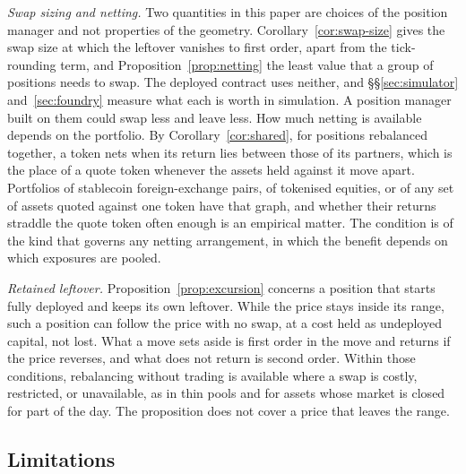 \documentclass[11pt,a4paper]{article}
\theoremstyle{siphon}
\begin{document}
\textit{Swap sizing and netting.} Two quantities in this paper are choices of the position manager and not properties of the geometry. Corollary~\ref{cor:swap-size} gives the swap size at which the leftover vanishes to first order, apart from the tick-rounding term, and Proposition~\ref{prop:netting} the least value that a group of positions needs to swap. The deployed contract uses neither, and \S\S\ref{sec:simulator} and~\ref{sec:foundry} measure what each is worth in simulation. A position manager built on them could swap less and leave less. How much netting is available depends on the portfolio. By Corollary~\ref{cor:shared}, for positions rebalanced together, a token nets when its return lies between those of its partners, which is the place of a quote token whenever the assets held against it move apart. Portfolios of stablecoin foreign-exchange pairs, of tokenised equities, or of any set of assets quoted against one token have that graph, and whether their returns straddle the quote token often enough is an empirical matter. The condition is of the kind that governs any netting arrangement, in which the benefit depends on which exposures are pooled.\cite{duffie2011}

\textit{Retained leftover.} Proposition~\ref{prop:excursion} concerns a position that starts fully deployed and keeps its own leftover. While the price stays inside its range, such a position can follow the price with no swap, at a cost held as undeployed capital, not lost. What a move sets aside is first order in the move and returns if the price reverses, and what does not return is second order. Within those conditions, rebalancing without trading is available where a swap is costly, restricted, or unavailable, as in thin pools and for assets whose market is closed for part of the day. The proposition does not cover a price that leaves the range.

\subsection{Limitations}\label{sec:limitations}
\end{document}
